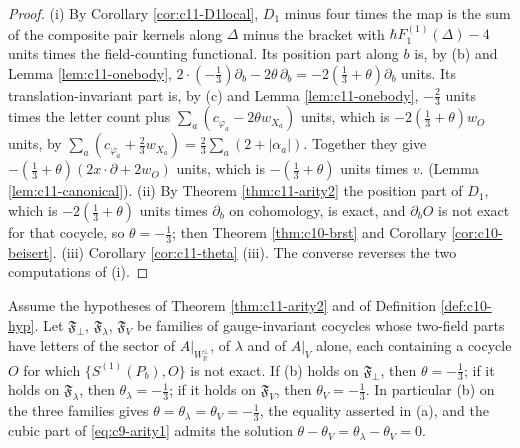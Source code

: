 \begin{proof}
(i) By Corollary \ref{cor:c11-D1local}, $D_1$ minus four times the map is the sum of the composite pair kernels along $\Delta$ minus the bracket with $\hbar F_1^{(1)}(\Delta)-4$ units times the field-counting functional. Its position part along $b$ is, by (b) and Lemma \ref{lem:c11-onebody}, $2\cdot(-\tfrac13)\partial_b-2\theta\,\partial_b=-2(\tfrac13+\theta)\partial_b$ units. Its translation-invariant part is, by (c) and Lemma \ref{lem:c11-onebody}, $-\tfrac23$ units times the letter count plus $\sum_a(c_{\varphi_a}-2\theta w_{X_a})$ units, which is $-2(\tfrac13+\theta)w_O$ units, by $\sum_a(c_{\varphi_a}+\tfrac23w_{X_a})=\tfrac23\sum_a(2+|\alpha_a|)$. Together they give $-(\tfrac13+\theta)(2x\cdot\partial+2w_O)$ units, which is $-(\tfrac13+\theta)$ units times $v.$ (Lemma \ref{lem:c11-canonical}). (ii) By Theorem \ref{thm:c11-arity2} the position part of $D_1$, which is $-2(\tfrac13+\theta)$ units times $\partial_b$ on cohomology, is exact, and $\partial_bO$ is not exact for that cocycle, so $\theta=-\tfrac13$; then Theorem \ref{thm:c10-brst} and Corollary \ref{cor:c10-beisert}. (iii) Corollary \ref{cor:c11-theta} (iii). The converse reverses the two computations of (i).
\end{proof}

\begin{proposition}
\label{prop:c11-theta-sector}
Assume the hypotheses of Theorem \ref{thm:c11-arity2} and of Definition \ref{def:c10-hyp}. Let $\mathfrak F_\perp$, $\mathfrak F_\lambda$, $\mathfrak F_V$ be families of gauge-invariant cocycles whose two-field parts have letters of the sector of $A|_{W_{\mathbb R}^\perp}$, of $\lambda$ and of $A|_V$ alone, each containing a cocycle $O$ for which $\{S^{(1)}(P_b),O\}$ is not exact. If (b) holds on $\mathfrak F_\perp$, then $\theta=-\tfrac13$; if it holds on $\mathfrak F_\lambda$, then $\theta_\lambda=-\tfrac13$; if it holds on $\mathfrak F_V$, then $\theta_V=-\tfrac13$. In particular (b) on the three families gives $\theta=\theta_\lambda=\theta_V=-\tfrac13$, the equality asserted in (a), and the cubic part of \eqref{eq:c9-arity1} admits the solution $\theta-\theta_V=\theta_\lambda-\theta_V=0$.
\end{proposition}

